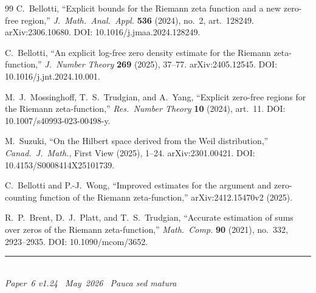 \documentclass[11pt]{article}
\begin{document}
\begin{thebibliography}{99}
C.~Bellotti,
``Explicit bounds for the Riemann zeta function and a new
zero-free region,''
\textit{J.\ Math.\ Anal.\ Appl.} \textbf{536} (2024),
no.~2, art.~128249.
arXiv:2306.10680.
DOI: 10.1016/j.jmaa.2024.128249.

C.~Bellotti,
``An explicit log-free zero density estimate for the Riemann
zeta-function,''
\textit{J.\ Number Theory} \textbf{269} (2025), 37--77.
arXiv:2405.12545.
DOI: 10.1016/j.jnt.2024.10.001.

M.~J.~Mossinghoff, T.~S.~Trudgian, and A.~Yang,
``Explicit zero-free regions for the Riemann zeta-function,''
\textit{Res.\ Number Theory} \textbf{10} (2024), art.~11.
DOI: 10.1007/s40993-023-00498-y.

M.~Suzuki,
``On the Hilbert space derived from the Weil distribution,''
\textit{Canad.\ J.\ Math.}, First View (2025), 1--24.
arXiv:2301.00421.
DOI: 10.4153/S0008414X25101739.

C.~Bellotti and P.-J.~Wong,
``Improved estimates for the argument and zero-counting function
of the Riemann zeta-function,''
arXiv:2412.15470v2 (2025).

R.~P.~Brent, D.~J.~Platt, and T.~S.~Trudgian,
``Accurate estimation of sums over zeros of the Riemann
zeta-function,''
\textit{Math.\ Comp.} \textbf{90} (2021), no.~332, 2923--2935.
DOI: 10.1090/mcom/3652.
\end{thebibliography}

\enlargethispage{3\baselineskip}
\vspace*{\fill}
\begin{minipage}{\linewidth}
\rule{\linewidth}{0.4pt}\smallskip\\
\small\emph{Paper~6 v1.24 \textperiodcentered\ May~2026
\textperiodcentered\ Pauca sed matura}
\end{minipage}
\end{document}
